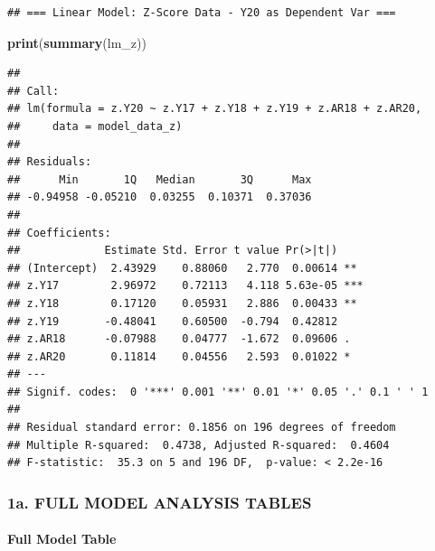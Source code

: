 \documentclass[
]{article}
\newenvironment{Shaded}{\begin{snugshade}}{\end{snugshade}}
\newcommand{\FunctionTok}[1]{\textcolor[rgb]{0.13,0.29,0.53}{\textbf{#1}}}
\newcommand{\NormalTok}[1]{#1}
\begin{document}
\begin{verbatim}
## === Linear Model: Z-Score Data - Y20 as Dependent Var ===
\end{verbatim}

\begin{Shaded}
\begin{Highlighting}[]
\FunctionTok{print}\NormalTok{(}\FunctionTok{summary}\NormalTok{(lm\_z))}
\end{Highlighting}
\end{Shaded}

\begin{verbatim}
## 
## Call:
## lm(formula = z.Y20 ~ z.Y17 + z.Y18 + z.Y19 + z.AR18 + z.AR20, 
##     data = model_data_z)
## 
## Residuals:
##      Min       1Q   Median       3Q      Max 
## -0.94958 -0.05210  0.03255  0.10371  0.37036 
## 
## Coefficients:
##             Estimate Std. Error t value Pr(>|t|)    
## (Intercept)  2.43929    0.88060   2.770  0.00614 ** 
## z.Y17        2.96972    0.72113   4.118 5.63e-05 ***
## z.Y18        0.17120    0.05931   2.886  0.00433 ** 
## z.Y19       -0.48041    0.60500  -0.794  0.42812    
## z.AR18      -0.07988    0.04777  -1.672  0.09606 .  
## z.AR20       0.11814    0.04556   2.593  0.01022 *  
## ---
## Signif. codes:  0 '***' 0.001 '**' 0.01 '*' 0.05 '.' 0.1 ' ' 1
## 
## Residual standard error: 0.1856 on 196 degrees of freedom
## Multiple R-squared:  0.4738, Adjusted R-squared:  0.4604 
## F-statistic:  35.3 on 5 and 196 DF,  p-value: < 2.2e-16
\end{verbatim}

\subsubsection{1a. FULL MODEL ANALYSIS
TABLES}\label{a.-full-model-analysis-tables}

\paragraph{Full Model Table}\label{full-model-table}
\end{document}
